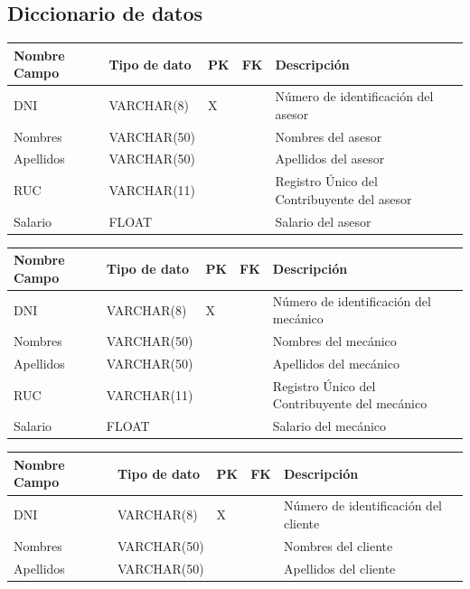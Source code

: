 \documentclass[12pt]{article}
\begin{document}
\subsection{Diccionario de datos}

\begin{tabular}{|l|l|l|l|l|}
\hline
Nombre Campo & Tipo de dato & PK & FK & Descripción \\
\hline
DNI & VARCHAR(8) & X &  & Número de identificación del asesor \\
Nombres & VARCHAR(50) &  &  & Nombres del asesor \\
Apellidos & VARCHAR(50) &  &  & Apellidos del asesor \\
RUC & VARCHAR(11) &  &  & Registro Único del Contribuyente del asesor \\
Salario & FLOAT &  &  & Salario del asesor \\
\hline
\end{tabular}

\begin{tabular}{|l|l|l|l|l|}
\hline
Nombre Campo & Tipo de dato & PK & FK & Descripción \\
\hline
DNI & VARCHAR(8) & X &  & Número de identificación del mecánico \\
Nombres & VARCHAR(50) &  &  & Nombres del mecánico \\
Apellidos & VARCHAR(50) &  &  & Apellidos del mecánico \\
RUC & VARCHAR(11) &  &  & Registro Único del Contribuyente del mecánico \\
Salario & FLOAT &  &  & Salario del mecánico \\
\hline
\end{tabular}

\begin{tabular}{|l|l|l|l|l|}
\hline
Nombre Campo & Tipo de dato & PK & FK & Descripción \\
\hline
DNI & VARCHAR(8) & X &  & Número de identificación del cliente \\
Nombres & VARCHAR(50) &  &  & Nombres del cliente \\
Apellidos & VARCHAR(50) &  &  & Apellidos del cliente \\
\hline
\end{tabular}
\end{document}
